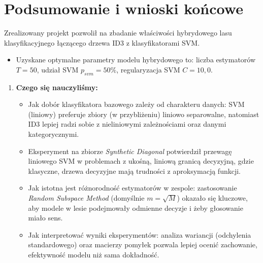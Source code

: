 \documentclass[a4paper,11pt]{article}
\begin{document}
\section{Podsumowanie i wnioski końcowe}
Zrealizowany projekt pozwolił na zbadanie właściwości hybrydowego lasu klasyfikacyjnego łączącego drzewa ID3 z klasyfikatorami SVM.
\begin{itemize}
    \item Uzyskane optymalne parametry modelu hybrydowego to: liczba estymatorów $T=50$, udział SVM $p_{svm}=50\%$, regularyzacja SVM $C=10{,}0$.
\end{itemize}
\begin{enumerate}
    \item \textbf{Czego się nauczyliśmy:}
    \begin{itemize}
        \item Jak dobór klasyfikatora bazowego zależy od charakteru danych: SVM (liniowy) preferuje zbiory (w przybliżeniu) liniowo separowalne, natomiast ID3 lepiej radzi sobie z nieliniowymi zależnościami oraz danymi kategorycznymi.
        \item Eksperyment na zbiorze \textit{Synthetic Diagonal} potwierdził przewagę liniowego SVM w problemach z ukośną, liniową granicą decyzyjną, gdzie klasyczne, drzewa decyzyjne mają trudności z aproksymacją funkcji.
        \item Jak istotna jest różnorodność estymatorów w zespole: zastosowanie \textit{Random Subspace Method} (domyślnie $m=\sqrt{M}$) okazało się kluczowe, aby modele w lesie podejmowały odmienne decyzje i żeby głosowanie miało sens.
        \item Jak interpretować wyniki eksperymentów: analiza wariancji (odchylenia standardowego) oraz macierzy pomyłek pozwala lepiej ocenić zachowanie, efektywność modelu niż sama dokładność.
    \end{itemize}
\end{enumerate}
\end{document}
